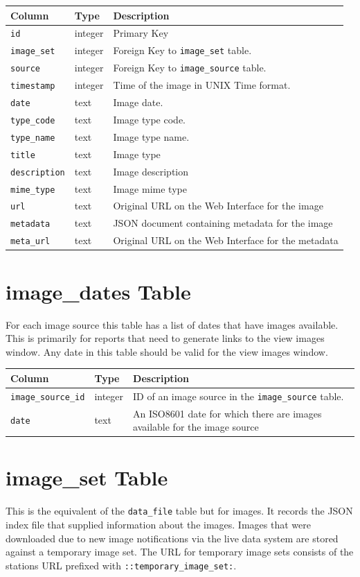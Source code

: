 \documentclass[a4paper,10pt]{book}
\begin{document}
\begin{tabular}{p{2.5cm} p{2.5cm} l}
\hline
\textbf{Column} & \textbf{Type} & \textbf{Description} \\
\hline
\verb|id| & integer & Primary Key\\
\verb|image_set| & integer & Foreign Key to \verb|image_set| table.\\
\verb|source| & integer & Foreign Key to \verb|image_source| table.\\
\verb|timestamp| & integer & Time of the image in UNIX Time format.\\
\verb|date| & text & Image date.\\
\verb|type_code| & text & Image type code.\\
\verb|type_name| & text & Image type name.\\
\verb|title| & text & Image type \\
\verb|description| & text & Image description\\
\verb|mime_type| & text & Image mime type\\
\verb|url| & text & Original URL on the Web Interface for the image\\
\verb|metadata| & text & JSON document containing metadata for the image\\
\verb|meta_url| & text & Original URL on the Web Interface for the metadata\\
\hline
\end{tabular}

\section{image\_dates Table}
For each image source this table has a list of dates that have images available. This is primarily for reports that need to generate links to the view images window. Any date in this table should be valid for the view images window.

\begin{tabular}{p{2.5cm} p{2.5cm} p{8.6cm}}
\hline
\textbf{Column} & \textbf{Type} & \textbf{Description} \\
\hline
\verb|image_source_id| & integer & ID of an image source in the \verb|image_source| table.\\
\verb|date| & text & An ISO8601 date for which there are images available for the image source \\
\hline
\end{tabular}

\section{image\_set Table}
This is the equivalent of the \verb|data_file| table but for images. It records the JSON index file that supplied information about the images. Images that were downloaded due to new image notifications via the live data system are stored against a temporary image set. The URL for temporary image sets consists of the stations URL prefixed with \verb|::temporary_image_set:|.
\end{document}
